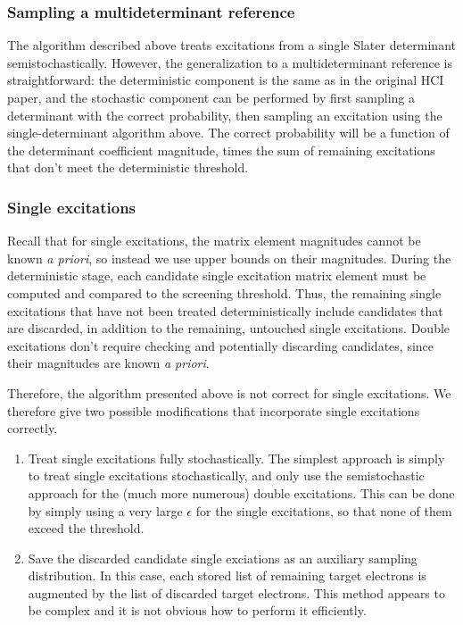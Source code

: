 \documentclass[english]{article}
\begin{document}
\subsubsection{Sampling a multideterminant reference}
The algorithm described above treats excitations from a single Slater determinant semistochastically. However, the generalization to a multideterminant reference is straightforward: the deterministic component is the same as in the original HCI paper, and the stochastic component can be performed by first sampling a determinant with the correct probability, then sampling an excitation using the single-determinant algorithm above. The correct probability will be a function of the determinant coefficient magnitude, times the sum of remaining excitations that don't meet the deterministic threshold.

\subsubsection{Single excitations}
Recall that for single excitations, the matrix element magnitudes cannot be known \emph{a priori}, so instead we use upper bounds on their magnitudes. During the deterministic stage, each candidate single excitation matrix element must be computed and compared to the screening threshold. Thus, the remaining single excitations that have not been treated deterministically include candidates that are discarded, in addition to the remaining, untouched single excitations. Double excitations don't require checking and potentially discarding candidates, since their magnitudes are known \emph{a priori}.

Therefore, the algorithm presented above is not correct for single excitations. We therefore give two possible modifications that incorporate single excitations correctly.
\begin{enumerate}
	\item Treat single excitations fully stochastically. The simplest approach is simply to treat single excitations stochastically, and only use the semistochastic approach for the (much more numerous) double excitations. This can be done by simply using a very large $\epsilon$ for the single excitations, so that none of them exceed the threshold.
	\item Save the discarded candidate single exciations as an auxiliary sampling distribution. In this case, each stored list of remaining target electrons is augmented by the list of discarded target electrons. This method appears to be complex and it is not obvious how to perform it efficiently.
\end{enumerate}
\end{document}
